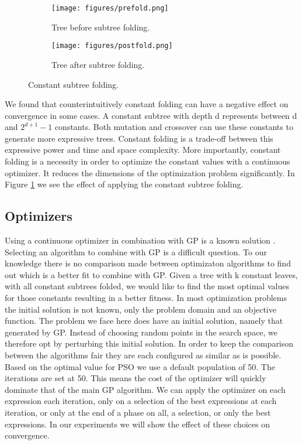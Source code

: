 \begin{figure}
	\centering
    \begin{subfigure}{0.5\textwidth}
    \centering
    \texttt{[image: figures/prefold.png]}
    \caption{Tree before subtree folding.}
	\end{subfigure}
	\begin{subfigure}{0.5\textwidth}
    \centering
    \texttt{[image: figures/postfold.png]}
    \caption{Tree after subtree folding.}
	\end{subfigure}
	    \caption{Constant subtree folding.}
    \label{fig:folding}
\end{figure}
We found that counterintuitively constant folding can have a negative effect on convergence in some cases. A constant subtree with depth d represents between d and $2^{d+1}-1$ constants. Both mutation and crossover can use these constants to generate more expressive trees. Constant folding is a trade-off between this expressive power and time and space complexity. More importantly, constant folding is a necessity in order to optimize the constant values with a continuous optimizer. It reduces the dimensions of the optimization problem significantly. In Figure \ref{fig:folding} we see the effect of applying the constant subtree folding. 
\subsection{Optimizers}
Using a continuous optimizer in combination with GP is a known solution \cite{GEDE, GPConst}.
Selecting an algorithm to combine with GP is a difficult question. To our knowledge there is no comparison made between optimizaton algorithms to find out which is a better fit to combine with GP. Given a tree with k constant leaves, with all constant subtrees folded, we would like to find the most optimal values for those constants resulting in a better fitness. In most optimization problems the initial solution is not known, only the problem domain and an objective function. The problem we face here does have an initial solution, namely that generated by GP. Instead of choosing random points in the search space, we therefore opt by perturbing this initial solution. In order to keep the comparison between the algorithms fair they are each configured as similar as is possible. Based on the optimal value for PSO \cite{PSO} we use a default population of 50. The iterations are set at 50. This means the cost of the optimizer will quickly dominate that of the main GP algorithm. We can apply the optimizer on each expression each iteration, only on a selection of the best expressions at each iteration, or only at the end of a phase on all, a selection, or only the best expressions. In our experiments we will show the effect of these choices on convergence.
